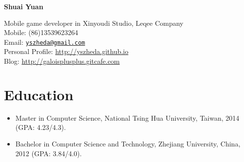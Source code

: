 \documentclass[letterpaper]{article}
\def\name{Shuai Yuan}
\begin{document}
\centerline{\huge\bf \name} \vspace{0.25in}
\begin{minipage}[t]{0.8\textwidth}
    Mobile game developer in Xinyoudi Studio, Leqee Company \\
    Mobile: (86)13539623264   \\
    Email: \href{mailto:yszheda@gmail.com}{\tt yszheda@gmail.com}\\
    Personal Profile: \url{http://yszheda.github.io} \\
    Blog: \url{http://galoisplusplus.gitcafe.com}
\end{minipage}

\section*{Education}
\begin{itemize}
    \item Master in Computer Science, National Tsing Hua University, Taiwan, 2014 (GPA: 4.23/4.3).
    \item Bachelor in Computer Science and Technology, Zhejiang University, China, 2012 (GPA: 3.84/4.0).
\end{itemize}
\end{document}

